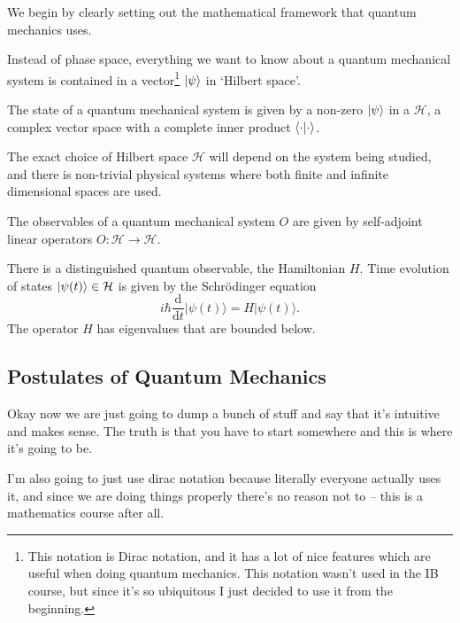 \documentclass[a4paper]{scrartcl}
\begin{document}
We begin by clearly setting out the mathematical framework that quantum mechanics uses.

Instead of phase space, everything we want to know about a quantum mechanical system is contained in a vector\footnote{This notation is Dirac notation, and it has a lot of nice features which are useful when doing quantum mechanics. This notation wasn't used in the IB course, but since it's so ubiquitous I just decided to use it from the beginning.} $\ket{\psi}$ in `Hilbert space'.

\begin{axiom}[State]
    The state of a quantum mechanical system is given by a non-zero  $\ket{\psi}$ in a  $\mathcal{H}$, a complex vector space with a complete inner product $\ip{\cdot}{\cdot}$.
\end{axiom}

The exact choice of Hilbert space $\mathcal{H}$ will depend on the system being studied, and there is non-trivial physical systems where both finite and infinite dimensional spaces are used.

\begin{axiom}[Observables]
    The observables of a quantum mechanical system $O$ are given by self-adjoint linear operators $O: \mathcal{H} \rightarrow \mathcal{H}$.
\end{axiom}

\begin{axiom}
    There is a distinguished quantum observable, the Hamiltonian $H$. Time evolution of states $\ket{\psi(t)} \in \mathcal{H}$ is given by the Schrödinger equation
    $$
    i \hbar \frac{\mathrm{d}}{\mathrm{d} t}|\psi(t)\rangle=H|\psi(t)\rangle.
    $$
    The operator $H$ has eigenvalues that are bounded below.
\end{axiom}

\subsection{Postulates of Quantum Mechanics}

Okay now we are just going to dump a bunch of stuff and say that it's intuitive and makes sense. The truth is that you have to start somewhere and this is where it's going to be.

I'm also going to just use dirac notation because literally everyone actually uses it, and since we are doing things properly there's no reason not to -- this is a mathematics course after all.
\end{document}
